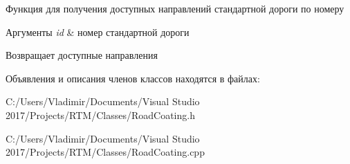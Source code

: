 Функция для получения доступных направлений стандартной дороги по номеру 
\begin{DoxyParams}{Аргументы}
{\em id} & номер стандартной дороги \\
\hline
\end{DoxyParams}
\begin{DoxyReturn}{Возвращает}
доступные направления 
\end{DoxyReturn}


Объявления и описания членов классов находятся в файлах\+:\begin{DoxyCompactItemize}
\item 
C\+:/\+Users/\+Vladimir/\+Documents/\+Visual Studio 2017/\+Projects/\+R\+T\+M/\+Classes/Road\+Coating.\+h\item 
C\+:/\+Users/\+Vladimir/\+Documents/\+Visual Studio 2017/\+Projects/\+R\+T\+M/\+Classes/Road\+Coating.\+cpp\end{DoxyCompactItemize}
